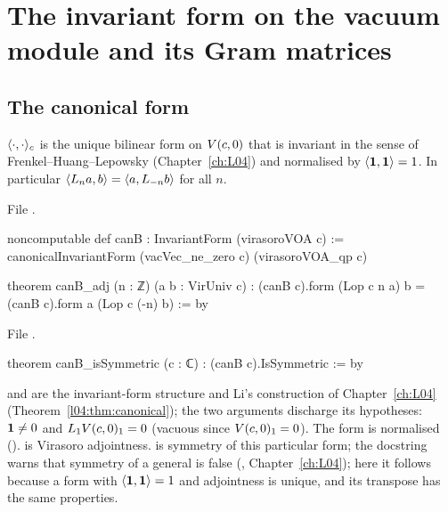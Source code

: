 \section{The invariant form on the vacuum module and its Gram matrices}\label{l06:sec:gram}

\subsection{The canonical form}

\begin{definition}\label{l06:def:canB}
$\langle \cdot,\cdot\rangle_c$ is the unique bilinear form on $V(c,0)$ that is invariant in the sense of
Frenkel--Huang--Lepowsky (Chapter~\ref{ch:L04}) and normalised by $\langle \mathbf{1},\mathbf{1}\rangle = 1$. In
particular $\langle L_na,b\rangle = \langle a,L_{-n}b\rangle$ for all $n$.
\end{definition}

File .
\begin{leancode}
noncomputable def canB : InvariantForm (virasoroVOA c) :=
  canonicalInvariantForm (vacVec_ne_zero c) (virasoroVOA_qp c)

theorem canB_adj (n : ℤ) (a b : VirUniv c) :
    (canB c).form (Lop c n a) b = (canB c).form a (Lop c (-n) b) := by
\end{leancode}
File .
\begin{leancode}
theorem canB_isSymmetric (c : ℂ) : (canB c).IsSymmetric := by
\end{leancode}

\begin{dictionary}
 and  are the invariant-form structure and Li's
construction of Chapter~\ref{ch:L04} (Theorem~\ref{l04:thm:canonical}); the two arguments discharge its
hypotheses: $\mathbf{1}\ne0$ and $L_1V(c,0)_1 = 0$ (vacuous since $V(c,0)_1 = 0$). The form is normalised
().  is Virasoro adjointness.  is symmetry
of this particular form; the docstring warns that symmetry of a general  is false
(, Chapter~\ref{ch:L04}); here it follows because a form with
$\langle \mathbf{1},\mathbf{1}\rangle = 1$ and adjointness is unique, and its transpose has the same properties.
\end{dictionary}

